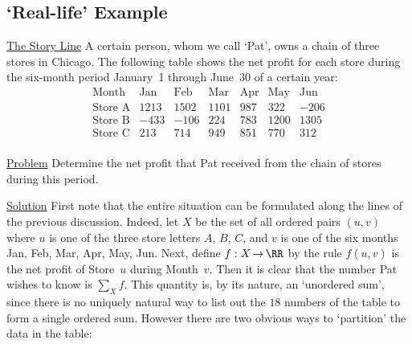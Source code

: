 \V
\V

            \subsection{\small{\bf `Real-life' Example}}
            \label{ExampB10.95}

        \underline{The Story Line} A certain person, whom we call `Pat', owns a chain of three stores in Chicago.
    The following table shows the net profit for each store during the six-month period January~1 through June~30 of a certain year:
        \begin{displaymath}
        \begin{array}{c|rrrrrr}  \hline
        \mbox{Month}   &
  \mbox{Jan} & \mbox{Feb} & \mbox{Mar} & \mbox{Apr} & \mbox{May} & \mbox{Jun} \\
        \mbox{Store A} &
       1213  &   1502     &    1101    &    987     &    322     &  -206      \\
        \mbox{Store B} &
       -433  &   -106     &     224    &    783     &   1200     &  1305      \\
        \mbox{Store C} &
        213  &    714     &     949    &    851     &    770     &   312      \\
        \end{array}
        \end{displaymath}

        \underline{Problem} Determine the net profit that Pat received from the chain of stores during this period.

        \underline{Solution} First note that the entire  situation can be  formulated along the lines of the previous discussion.
    Indeed, let $X$ be the set of all ordered pairs $(u,v)$ where $u$ is one of the three store letters $A$, $B$, $C$, and $v$ is one of the six months Jan, Feb, Mar, Apr, May, Jun.
    Next, define $f:X \,{\rightarrow}\, {\RR}$ by the rule $f(u,v)$ is the net profit of Store~$u$ during Month~$v$.
    Then it is clear that the number Pat wishes to know is ${\sum}_{X} f$. 
    This quantity is, by its nature, an `unordered sum', since there is no uniquely natural way to list out the $18$ numbers of the table to form a single ordered sum.
    However there are two obvious ways to `partition' the data in the table:

